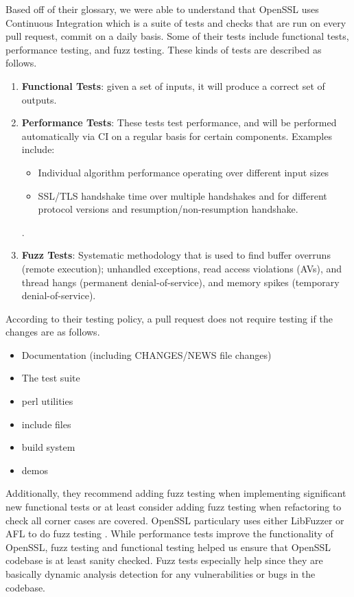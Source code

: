 \documentclass[conference]{IEEEtran}
\begin{document}
Based off of their glossary, we were able to understand that OpenSSL
uses Continuous Integration which is a suite of tests and checks that
are run on every pull request, commit on a daily basis. Some of their
tests include functional tests, performance testing, and fuzz
testing\cite{9}. These kinds of tests are described as follows.

\begin{enumerate}
\item \textbf{Functional Tests}: given a set of inputs, it
  will produce a correct set of outputs\cite{9}.

\item \textbf{Performance Tests}: These tests test performance, and
  will be performed automatically via CI on a regular basis for
  certain components. Examples include:

  \begin{itemize}
  \item Individual algorithm performance operating over different
    input sizes
  \item SSL/TLS handshake time over multiple handshakes and for
    different protocol versions and resumption/non-resumption
    handshake.
  \end{itemize}\cite{9}.

\item \textbf{Fuzz Tests}: Systematic methodology that is used to find
  buffer overruns (remote execution); unhandled exceptions, read
  access violations (AVs), and thread hangs (permanent
  denial-of-service), and memory spikes (temporary
  denial-of-service)\cite{10}.

\end{enumerate}

According to their testing policy, a pull request does not require testing
if the changes are as follows\cite{9}.

\begin{itemize}
\item Documentation (including CHANGES/NEWS file changes)
\item The test suite
\item perl utilities
\item include files
\item build system
\item demos
\end{itemize}

Additionally, they recommend adding fuzz testing when implementing
significant new functional tests or at least consider adding fuzz
testing when refactoring to check all corner cases are
covered\cite{9}.  OpenSSL particulary uses either LibFuzzer or AFL to
do fuzz testing \cite{11}. While performance tests improve the
functionality of OpenSSL, fuzz testing and functional testing helped
us ensure that OpenSSL codebase is at least sanity checked. Fuzz tests
especially help since they are basically dynamic analysis detection
for any vulnerabilities or bugs in the codebase.
\end{document}
